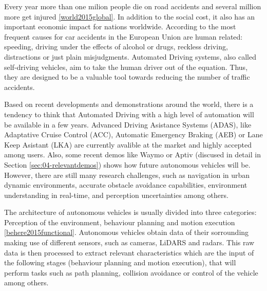 Every year more than one milion people die on road accidents and several 
million more get injured \ref{world2015global}. In addition to the social cost, it also has an
important economic impact for nations worldwide. According to 
\cite{Thomas2013} the most frequent causes for car accidents in the
European Union are human related: speeding, driving under the effects of
alcohol or drugs, reckless driving, distractions or just plain misjudgments.
Automated Driving systems, also called self-driving vehicles, aim to take the 
human driver out of the equation. Thus, they are designed to be a valuable tool
towards reducing the number of traffic accidents.

Based on recent developments and demonstrations around the world, there is a 
tendency to think that Automated Driving with a high level of automation will 
be available in a few years. 
Advanced Driving Asistance Systems (ADAS), like Adaptative Cruise Control 
(ACC), Automatic Emergency Braking (AEB) or Lane Keep Asistant (LKA) are
currently avalible at the market and highly accepted among users. 
Also, some recent demos like Waymo or Aptiv 
(discused in detail in Section \ref{sec:04-relevantdemos}) shows how future 
autonomous vehicles will be.
However, there are still many research challenges, such as navigation in urban 
dynamic environments, accurate obstacle avoidance capabilities, environment 
understanding in real-time, and perception uncertainties among others.
%

The architecture of autonomous vehicles is usually divided into three 
categories: Perception of the environment, behaviour planning and motion 
execution \ref{behere2015functional}. Autonomous 
vehicles obtain data of their sorrounding making use 
of different sensors, such as cameras, LiDARS and radars. This raw data is then 
processed to extract relevant characteristics which are the input of the 
following stages (behaviour planning and motion execution), that will 
perform tasks such as path planning, collision avoidance or control of the 
vehicle among others. 

